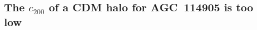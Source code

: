 \documentclass[fleqn,usenatbib]{mnras}
\begin{document}
\subsection{The $c_{200}$ of a CDM halo for AGC~114905 is too low}
\label{sec:low_c200}
\end{document}

